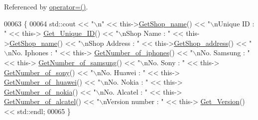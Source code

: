 Referenced by \hyperlink{_t_a_l_l_a_g_h___w_8h_source_l00075}{operator=()}.


\begin{DoxyCode}
00063 \{
00064     std::cout << \textcolor{stringliteral}{"\(\backslash\)n"} << this->\hyperlink{class_t_a_l_l_a_g_h___w_a3baca7e101bfde39d7a1bf91d99c4f51_a3baca7e101bfde39d7a1bf91d99c4f51}{GetShop\_name}() << \textcolor{stringliteral}{"\(\backslash\)nUnique ID : "} << this->
      \hyperlink{class_o_s_t_m_a5a01a8b98d16b1d1904ecf9356e7b71d_a5a01a8b98d16b1d1904ecf9356e7b71d}{Get\_Unique\_ID}() << \textcolor{stringliteral}{"\(\backslash\)nShop Name : "}  << this->\hyperlink{class_t_a_l_l_a_g_h___w_a3baca7e101bfde39d7a1bf91d99c4f51_a3baca7e101bfde39d7a1bf91d99c4f51}{GetShop\_name}() << \textcolor{stringliteral}{"\(\backslash\)nShop Address : 
      "} << this->\hyperlink{class_t_a_l_l_a_g_h___w_a591b5f445be4f3b636b415e7b614b82c_a591b5f445be4f3b636b415e7b614b82c}{GetShop\_address}() << \textcolor{stringliteral}{"\(\backslash\)nNo. Iphones : "} << this->
      \hyperlink{class_t_a_l_l_a_g_h___w_ad82b0c59cba2cb442520e35ab6011d17_ad82b0c59cba2cb442520e35ab6011d17}{GetNumber\_of\_iphones}() << \textcolor{stringliteral}{"\(\backslash\)nNo. Samsung : "} << this->
      \hyperlink{class_t_a_l_l_a_g_h___w_ad400c7b40f8605f5419b09e946677bbb_ad400c7b40f8605f5419b09e946677bbb}{GetNumber\_of\_samsung}() << \textcolor{stringliteral}{"\(\backslash\)nNo. Sony : "} << this->
      \hyperlink{class_t_a_l_l_a_g_h___w_a161417e8ef4952c560182735de51a44f_a161417e8ef4952c560182735de51a44f}{GetNumber\_of\_sony}() << \textcolor{stringliteral}{"\(\backslash\)nNo. Huawei : "} << this->
      \hyperlink{class_t_a_l_l_a_g_h___w_a0ac4137af5b2aa2e4157c7e85629f064_a0ac4137af5b2aa2e4157c7e85629f064}{GetNumber\_of\_huawei}() << \textcolor{stringliteral}{"\(\backslash\)nNo. Nokia : "} << this->
      \hyperlink{class_t_a_l_l_a_g_h___w_a20a127a379a2ebed2bd7ee89ca5661fb_a20a127a379a2ebed2bd7ee89ca5661fb}{GetNumber\_of\_nokia}() << \textcolor{stringliteral}{"\(\backslash\)nNo. Alcatel : "} << this->
      \hyperlink{class_t_a_l_l_a_g_h___w_a548597d48b3bbb35ffa2035eee3b645d_a548597d48b3bbb35ffa2035eee3b645d}{GetNumber\_of\_alcatel}() << \textcolor{stringliteral}{"\(\backslash\)nVersion number : "} << this->
      \hyperlink{class_o_s_t_m_a1f1db9d482f22c8e7caa17dfb340626b_a1f1db9d482f22c8e7caa17dfb340626b}{Get\_Version}() << std::endl;
00065 \}
\end{DoxyCode}


